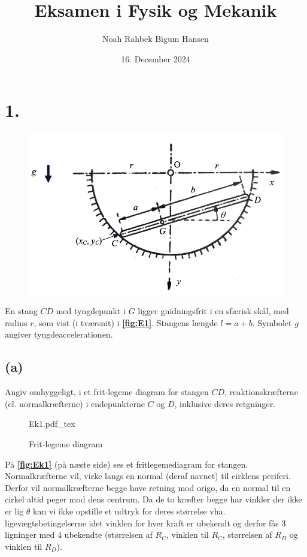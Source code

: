 \documentclass[12pt]{article}
\title{Eksamen i Fysik og Mekanik}
\author{Noah Rahbek Bigum Hansen}
\date{16. December 2024}
\newcommand{\incfig}[2][1]{%
  \def\svgwidth{#1\columnwidth}
  {#2.pdf_tex}
}
\theoremstyle{definition}
\begin{document}
\maketitle

\section*{1.}
\begin{figure} [ht]
  \centering
  \caption{}
  \includegraphics[width=0.35\linewidth]{../figures/E1.png}
  \label{fig:E1}
\end{figure}

En stang $CD$ med tyngdepunkt i $G$ ligger gnidningsfrit i en sfærisk skål, med radius $r$, som vist (i tværsnit) i \textbf{\autoref{fig:E1}}. Stangens længde $l = a + b$. Symbolet $g$ angiver tyngdeaccelerationen.

\subsection*{(a)}
Angiv omhyggeligt, i et frit-legeme diagram for stangen $CD$, reaktionskræfterne (el. normalkræfterne) i endepunkterne $C$ og $D$, inklusive deres retgninger.
\bigbreak
\begin{figure}[ht]
  \centering
  \incfig[0.6]{Ek1}
  \caption{Frit-legeme diagram}
  \label{fig:Ek1}
\end{figure}
På \underline{\underline{\textbf{\autoref{fig:Ek1}}}} (på næste side) ses et fritlegemediagram for stangen. Normalkræfterne vil, virke langs en normal (deraf navnet) til cirklens periferi. Derfor vil normalkræfterne begge have retning mod origo, da en normal til en cirkel altid peger mod dens centrum. Da de to kræfter begge har vinkler der ikke er lig $\theta$ kan vi ikke opstille et udtryk for deres størrelse vha. ligevægtsbetingelserne idet vinklen for hver kraft er ubekendt og derfor fås 3 ligninger med 4 ubekendte (størrelsen af $R_C$, vinklen til $R_C$, størrelsen af $R_D$ og vinklen til $R_D$).
\end{document}
